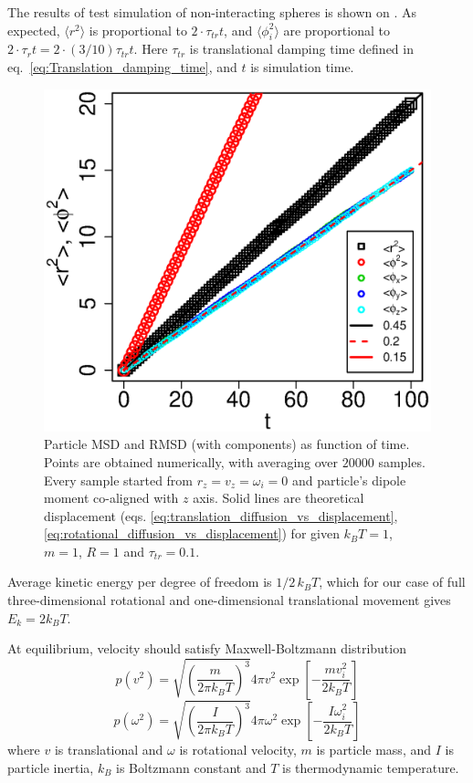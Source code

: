 The results of test simulation of non-interacting spheres is shown on . As expected, $\langle r^2\rangle$ is proportional to $2 \cdot \tau_{tr} t$, and $\langle \phi_i^2\rangle$ are proportional to $2 \cdot \tau_r t = 2 \cdot (3/10) \tau_{tr} t$. Here $\tau_{tr}$ is translational damping time defined in eq.~\eqref{eq:Translation_damping_time}, and $t$ is simulation time.
\begin{figure}[t]
\centering
	\includegraphics[height=0.7\columnwidth]{Images/DiffusionStats_drift}
	\caption{Particle MSD and RMSD (with components) as function of time. Points are obtained numerically, with averaging over $20000$ samples. Every sample started from $r_z = v_z = \omega_i = 0$ and particle's  dipole moment co-aligned with $z$ axis. Solid lines are theoretical displacement (eqs. \eqref{eq:translation_diffusion_vs_displacement}, \eqref{eq:rotational_diffusion_vs_displacement}) for given $k_BT = 1$, $m = 1$, $R = 1$ and $\tau_{tr} = 0.1$.}
	\label{fig:diffusion_stats_mean_square_displacement}
\end{figure}
Average kinetic energy per degree of freedom is $1/2 \, k_B T$, which for our case of full three-dimensional rotational and one-dimensional translational movement gives $E_k = 2 k_B T$.

At equilibrium, velocity should satisfy Maxwell-Boltzmann distribution
\begin{equation}
\label{eq:maxwell_boltzmann_velocity}
		p(v^2)
			= \sqrt{ \left(\frac{m}{2 \pi k_B T}\right)^3}
			4 \pi v^2 \exp \left[-\frac{mv_i^2}{2k_BT}\right]
\end{equation}
\begin{equation}
		p(\omega^2)
			= \sqrt{ \left(\frac{I}{2 \pi k_B T}\right)^3}
			4 \pi \omega^2 \exp\left[-\frac{I\omega_i^2}{2 k_B T}\right]
\end{equation}
where $v$ is translational and $\omega$ is rotational velocity, $m$ is particle mass, and $I$ is particle inertia, $k_B$ is Boltzmann constant and $T$ is thermodynamic temperature.

